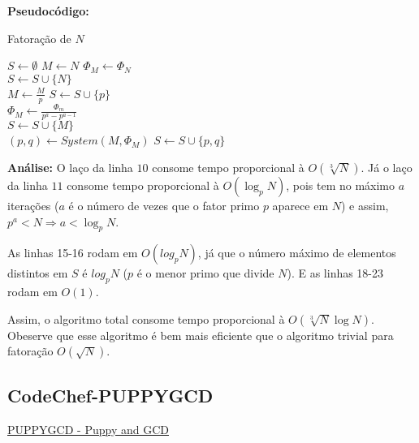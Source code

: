 \textbf{Pseudocódigo:}
\begin{algorithm}
\caption{Fatoração de $N$}
\begin{algorithmic}[1]
\State $S \gets \emptyset$ 
\State $M \gets N$
\State $\Phi_M \gets \Phi_N$
\\
 
\State $S \gets S \cup \{N\}$
\State {}
\EndIf
\\
\State $M \gets \frac{M}{p}$
\State $S \gets S \cup \{p\}$
\EndWhile
\EndFor
\\
\State $\Phi_M \gets \frac{\Phi_m}{p^a - p^{a-1}}$ 
\EndFor
\\
 
\State $S \gets S \cup \{M\}$
\State {}
\EndIf
\\
\State $(p, q) \gets System(M, \Phi_M)$ 
\State $S \gets S \cup \{p, q\}$
\State {}

\EndProcedure
\end{algorithmic}
\end{algorithm}


\textbf{Análise:}
O laço da linha $10$ consome tempo proporcional à $O(\sqrt[3]N)$. Já o laço da linha $11$ consome tempo proporcional à $O(\log_pN)$, pois tem no máximo $a$ iterações ($a$ é o número de vezes que o fator primo $p$ aparece em $N$) e assim, $p^a < N \Rightarrow a < \log_p{N}$. 

As linhas 15-16 rodam em $O(log_pN)$, já que o número máximo de elementos distintos em $S$ é $log_pN$ ($p$ é o menor primo que divide $N$).
E as linhas 18-23 rodam em $O(1)$.

Assim, o algoritmo total consome tempo proporcional à $O(\sqrt[3]N \log N)$. 
Obeserve que esse algoritmo é bem mais eficiente que o algoritmo trivial para fatoração $O(\sqrt N)$.


\subsection{CodeChef-PUPPYGCD}
\href{https://www.codechef.com/problems/PUPPYGCD}{PUPPYGCD - Puppy and GCD}\\


